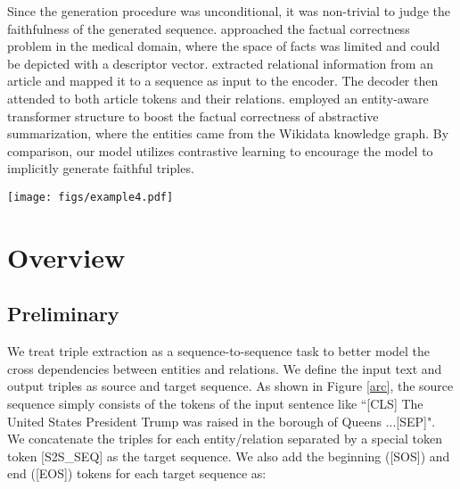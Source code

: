 \documentclass[letterpaper]{article} \usepackage{aaai21}  \usepackage{times}  \usepackage{helvet} \usepackage{courier}  \usepackage[hyphens]{url}  \usepackage{graphicx} \urlstyle{rm} \def\UrlFont{\rm}  \usepackage{natbib}  \usepackage[noend]{algpseudocode}
\begin{document}
Since the generation procedure was unconditional, it was non-trivial to judge the faithfulness of the generated sequence. \citet{zhang2019optimizing} approached the factual correctness problem in the medical domain, where the space of facts was limited and could be depicted with a descriptor vector. \citet{cao2017faithful} extracted relational information from an article and mapped it to a sequence as input to the encoder. The decoder then attended to both article tokens and their relations. \citet{gunel2020mind} employed an entity-aware transformer structure to boost the factual correctness of abstractive summarization, where the entities came from the Wikidata knowledge graph. By comparison, our model utilizes contrastive learning to encourage the model to implicitly generate faithful triples. 





\begin{figure*}[h]
\centering
  \texttt{[image: figs/example4.pdf]}
\caption{The architecture of \textbf{C}ontrastive triple extraction with \textbf{G}enerative \textbf{T}ransformer (CGT).  The top-right component refers to the generative transformer, and the bottom-right component represents triplet contrastive learning. Those two parts are optimized jointly. The left is the input encoder (best viewed in color).}
\label{arc}
\end{figure*}

\section{Overview}

\subsection{Preliminary}
We treat triple extraction as a sequence-to-sequence task to better model the cross dependencies between entities and relations. We define the input text and output triples as source and target sequence. As shown in Figure \ref{arc}, the source sequence simply consists of the tokens of the input sentence like ``[CLS] The United States President Trump was raised in the borough of Queens ...[SEP]". We concatenate the triples for each entity/relation separated by a special token token [S2S\_SEQ] as the target sequence. We also add the beginning ([SOS]) and end ([EOS]) tokens for each target sequence as:
\begin{center}

\end{center}
 
\end{document}
